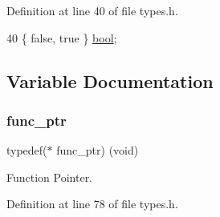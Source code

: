 Definition at line 40 of file types.\+h.


\begin{DoxyCode}
40 \{ \textcolor{keyword}{false}, \textcolor{keyword}{true} \} \hyperlink{a00104_af6a258d8f3ee5206d682d799316314b1_af6a258d8f3ee5206d682d799316314b1}{bool};
\end{DoxyCode}


\subsection{Variable Documentation}
\mbox{\label{a00104_a5e730b1100d491afc6fa17d12fcd15a8_a5e730b1100d491afc6fa17d12fcd15a8}} 
\subsubsection{\texorpdfstring{func\+\_\+ptr}{func\_ptr}}
{\footnotesize\ttfamily typedef($\ast$ func\+\_\+ptr) (void)}



Function Pointer. 



Definition at line 78 of file types.\+h.

